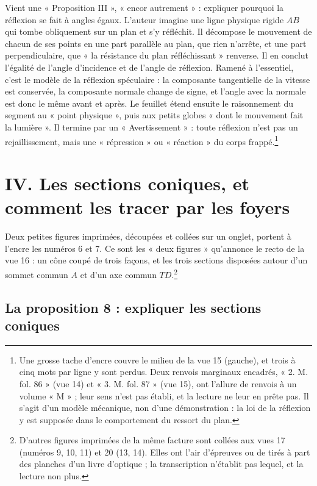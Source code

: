 \documentclass[11pt,a4paper]{article}
\begin{document}
Vient une « Proposition III », « encor autrement » : expliquer pourquoi la
réflexion se fait à angles égaux. L'auteur imagine une ligne physique rigide
\(AB\) qui tombe obliquement sur un plan et s'y réfléchit. Il décompose le
mouvement de chacun de ses points en une part parallèle au plan, que rien
n'arrête, et une part perpendiculaire, que « la résistance du plan
réfléchissant » renverse. Il en conclut l'égalité de l'angle d'incidence et de
l'angle de réflexion. Ramené à l'essentiel, c'est le modèle de la réflexion
spéculaire : la composante tangentielle de la vitesse est conservée, la
composante normale change de signe, et l'angle avec la normale est donc le même
avant et après. Le feuillet étend ensuite le raisonnement du segment au « point
physique », puis aux petits globes « dont le mouvement fait la lumière ». Il
termine par un « Avertissement » : toute réflexion n'est pas un rejaillissement,
mais une « répression » ou « réaction » du corps frappé.\footnote{Une grosse
tache d'encre couvre le milieu de la vue 15 (gauche), et trois à cinq mots par
ligne y sont perdus. Deux renvois marginaux encadrés, « 2. M. fol. 86 » (vue 14)
et « 3. M. fol. 87 » (vue 15), ont l'allure de renvois à un volume « M » ; leur
sens n'est pas établi, et la lecture ne leur en prête pas. Il s'agit d'un
modèle mécanique, non d'une démonstration : la loi de la réflexion y est
supposée dans le comportement du ressort du plan.}

\section*{IV. Les sections coniques, et comment les tracer par les foyers}

Deux petites figures imprimées, découpées et collées sur un onglet, portent à
l'encre les numéros 6 et 7. Ce sont les « deux figures » qu'annonce le recto de
la vue 16 : un cône coupé de trois façons, et les trois sections disposées
autour d'un sommet commun \(A\) et d'un axe commun \(TD\).\footnote{D'autres
figures imprimées de la même facture sont collées aux vues 17 (numéros 9, 10,
11) et 20 (13, 14). Elles ont l'air d'épreuves ou de tirés à part des planches
d'un livre d'optique ; la transcription n'établit pas lequel, et la lecture non
plus.}

\subsection*{La proposition 8 : expliquer les sections coniques}
\end{document}
